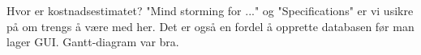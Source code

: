 
Hvor er kostnadsestimatet? "Mind storming for ..." og "Specifications" er vi usikre på om trengs å være med her. Det er også en fordel å opprette databasen før man lager GUI. Gantt-diagram var bra.